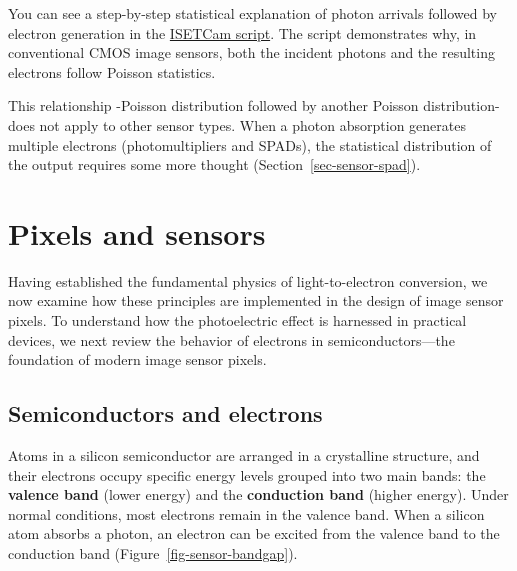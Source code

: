 \documentclass[
  letterpaper,
]{book}
\begin{document}
\begin{tcolorbox}[enhanced jigsaw, opacitybacktitle=0.6, breakable, bottomtitle=1mm, leftrule=.75mm, colframe=quarto-callout-note-color-frame, colback=white, left=2mm, opacityback=0, title=\textcolor{quarto-callout-note-color}{\faInfo}\hspace{0.5em}{ISETCam: shot noise}, toptitle=1mm, bottomrule=.15mm, titlerule=0mm, arc=.35mm, colbacktitle=quarto-callout-note-color!10!white, toprule=.15mm, rightrule=.15mm, coltitle=black]

You can see a step-by-step statistical explanation of photon arrivals
followed by electron generation in the
\href{../code/fise_photonsElectrons.html}{ISETCam script}. The script
demonstrates why, in conventional CMOS image sensors, both the incident
photons and the resulting electrons follow Poisson statistics.

This relationship -Poisson distribution followed by another Poisson
distribution- does not apply to other sensor types. When a photon
absorption generates multiple electrons (photomultipliers and SPADs),
the statistical distribution of the output requires some more thought
(Section~\ref{sec-sensor-spad}).

\end{tcolorbox}

\chapter{Pixels and sensors}\label{sec-pixels}

Having established the fundamental physics of light-to-electron
conversion, we now examine how these principles are implemented in the
design of image sensor pixels. To understand how the photoelectric
effect is harnessed in practical devices, we next review the behavior of
electrons in semiconductors---the foundation of modern image sensor
pixels.

\section{Semiconductors and electrons}\label{sec-semiconductor-physics}

Atoms in a silicon semiconductor are arranged in a crystalline
structure, and their electrons occupy specific energy levels grouped
into two main bands: the \textbf{valence band} (lower energy) and the
\textbf{conduction band} (higher energy). Under normal conditions, most
electrons remain in the valence band. When a silicon atom absorbs a
photon, an electron can be excited from the valence band to the
conduction band (Figure~\ref{fig-sensor-bandgap}).
\end{document}
